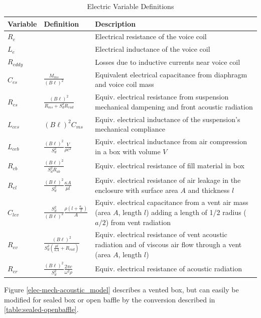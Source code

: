 \documentclass[10pt,letterpaper]{book}
\begin{document}
\begin{table}
\centering
\renewcommand{\arraystretch}{1.5}
\begin{tabularx}{\textwidth}{@{} ll X @{}}
\toprule
Variable & Definition & Description \\
\midrule
$R_e$ & & Electrical resistance of the voice coil\\
$L_e$ & & Electrical inductance of the voice coil\\
$R_{eddy}$ & & Losses due to inductive currents near voice coil\\
$C_{es}$ & $\frac{M_{ms}}{(B\ell)^2}$ & Equivalent electrical capacitance from diaphragm and voice coil mass\\
$R_{es}$ & $\frac{(B\ell)^2}{R_{ms}+S_d^2R_{rad}}$ & Equiv. electrical resistance from suspension mechanical dampening and front acoustic radiation\\
$L_{ces}$ & $(B\ell)^2C_{ms}$ & Equiv. electrical inductance of the suspension's mechanical compliance\\
$L_{ceb}$ & $\frac{(B\ell)^2}{S_d^2} \frac{V}{\rho c^2}$ & Equiv. electrical inductance from air compression in a box with volume $V$\\
$R_{eb}$ & $\frac{(B\ell)^2}{S_d^2 R_{ab}}$ & Equiv. electrical resistance of fill material in box\\
$R_{el}$ & $\frac{(B\ell)^2}{S_d^2 } \frac{\kappa A}{\mu l}$ & Equiv. electrical resistance of air leakage in the enclosure with surface area $A$ and thickness $l$\\
$C_{lev}$ & $\frac{S_d^2}{(B\ell)^2}\frac{\rho \left(l+\frac{a_v}{2}\right)}{A}$ & Equiv. electrical capacitance from a vent air mass (area $A$, length $l$) adding a length of 1/2 radius ($a/2$) from vent radiation\\
$R_{ev}$ & $\frac{(B\ell)^2}{S_d^2\left( \frac{\mu l}{\kappa A}+R_{rad}\right)}$ & Equiv. electrical resistance of vent acoustic radiation and of viscous air flow through a vent (area $A$, length $l$)\\
$R_{er}$ & $\frac{(B\ell)^2}{S_d^2}\frac{2\pi c}{\omega^2 \rho}$& Equiv. electrical resistance of acoustic radiation\\
\bottomrule
\end{tabularx}
\caption{Electric Variable Definitions}\label{table:variables}
\end{table}

Figure \ref{elec-mech-acoustic_model} describes a vented box, but can easily be modified for sealed box or open baffle by the conversion described in \ref{table:sealed-openbaffle}.
\end{document}
